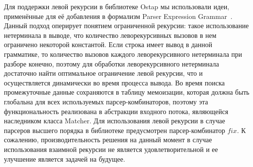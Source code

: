 \documentclass [a4paper] {article}
\begin{document}
Для поддержки левой рекурсии в библиотеке Ostap мы использовали идеи, применённые для её добавления в формализм Parser Expression Grammar~\cite{Medeiros2012}. Данный подход оперирует понятием ограниченной рекурсии: такое использование нетерминала в выводе, что количество леворекурсивных вызовов в нем ограничено некоторой константой. Если строка имеет вывод в данной грамматике, то количество вызовов каждого леворекурсивного нетерминала при разборе конечно, поэтому для обработки леворекурсивного нетерминала достаточно найти оптимальное ограничение левой рекурсии, что и осуществляется динамически во время процесса вывода. Во время поиска промежуточные данные сохраняются в таблицу мемоизации, которая должна быть глобальна для всех используемых парсер-комбинаторов, поэтому эта функциональность реализована в абстракции входного потока, являющейся наследником класса Matcher. Для использования левой рекурсии в случае парсеров высшего порядка в библиотеке предусмотрен парсер-комбинатор $fix$. К сожалению, производительность решения на данный момент в случае использования взаимной рекурсии не является удовлетворительной и ее улучшение является задачей на будущее. 

\printbibliography
\end{document}
